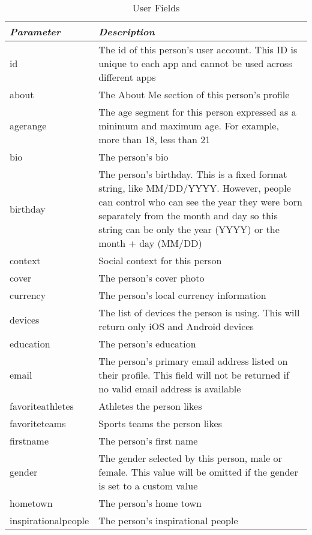\documentclass{article}
\begin{document}
		\begin{table}[H]
		\centering
		\caption{User Fields}
		\label{my-label}
		\begin{tabularx}{\textwidth}{|l|X|}
		\hline
		\emph{\textbf{Parameter}} & \emph{\textbf{Description}} 	\\ \hline
		id 				& The id of this person's user account. This ID is unique to each app and cannot be used across different apps \\ \hline
		about 			& The About Me section of this person's profile \\ \hline
		age\textunderscore range 		& The age segment for this person expressed as a minimum and maximum age. For example, more than 18, less than 21 \\   \hline
		bio 		& The person's bio \\   \hline
		birthday 		& The person's birthday. This is a fixed format string, like MM/DD/YYYY. However, people can control who can see the year they were born separately from the month and day so this string can be only the year (YYYY) or the month + day (MM/DD) \\   \hline
		context 		& Social context for this person \\   \hline
		cover 		& The person's cover photo \\   \hline
		currency 		& The person's local currency information \\   \hline
		devices 			& The list of devices the person is using. This will return only iOS and Android devices \\ \hline
		education 			& The person's education \\ \hline
		email 			& The person's primary email address listed on their profile. This field will not be returned if no valid email address is available \\ \hline
		favorite\textunderscore athletes 		& Athletes the person likes	\\ \hline
		favorite\textunderscore teams 		& Sports teams the person likes	\\ \hline
		first\textunderscore name 		& The person's first name	\\ \hline
		gender 			& The gender selected by this person, male or female. This value will be omitted if the gender is set to a custom value
 \\ \hline
		hometown 			& The person's home town \\ \hline
		inspirational\textunderscore people 		& The person's inspirational people	\\ \hline

\end{tabularx}
\end{table}
\end{document}
